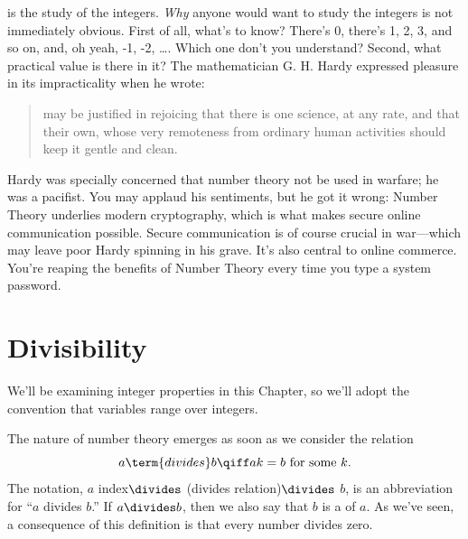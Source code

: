 
\label{number_theory_chap}
 is the study of the integers.  \emph{Why} anyone
would want to study the integers is not immediately obvious.  First of
all, what's to know?  There's 0, there's 1, 2, 3, and so on, and, oh yeah,
-1, -2, \dots.  Which one don't you understand?  Second, what practical
value is there in it?
The mathematician G. H. Hardy expressed pleasure in its impracticality
when he wrote:
%
 \begin{quotation}
  may be justified in rejoicing that there
 is one science, at any rate, and that their own, whose very remoteness
 from ordinary human activities should keep it gentle and clean.
 \end{quotation}
%

 Hardy was specially concerned that number theory not be used in warfare;
 he was a pacifist.  You may applaud his sentiments, but he got it wrong:
 Number Theory underlies modern cryptography, which is what makes secure
 online communication possible.  Secure communication is of course crucial
 in war---which may leave poor Hardy spinning in his grave.  It's also
 central to online commerce.  You're reaping the benefits of Number Theory
 every time you type a system password.


\section{Divisibility}\label{divisibility_sec}

We'll be examining integer properties in this Chapter, so we'll adopt the
convention that variables range over integers.

The nature of number theory emerges as soon as we consider the
 relation
\[
a \term{ divides } b \qiff ak = b \text{ for some } k.
\]
The notation, $a$ index{$\divides$ (divides relation)}$\divides$ $b$, is
an abbreviation for ``$a$ divides $b$.''  If $a \divides b$, then we also
say that $b$ is a  of $a$.  As we've seen, a consequence of
this definition is that every number divides zero.

